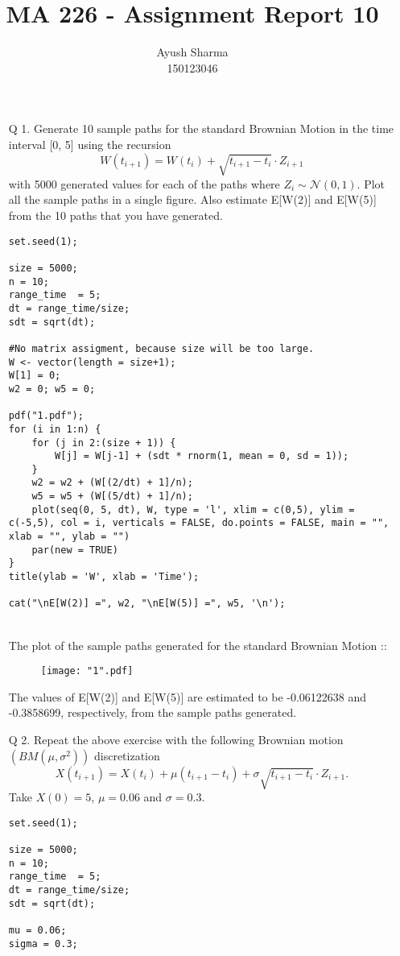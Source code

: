 \documentclass[11pt]{article}
\title{MA 226 - Assignment Report 10}
\author{Ayush Sharma\\150123046}
\begin{document}
\titlepage
\newpage
\begin{enumerate}
\item[Q 1.] Generate 10 sample paths for the standard Brownian Motion in the time interval [0, 5] using the recursion
$$W(t_{i+1}) = W(t_{i}) + \sqrt{t_{i+1} - t_{i}} \cdot Z_{i+1}$$
with 5000 generated values for each of the paths where $Z_{i} \sim \mathcal{N}(0,1)$. Plot all the sample paths in a single figure. Also estimate E[W(2)] and E[W(5)] from the 10 paths that you have generated.

\begin{lstlisting}
set.seed(1);

size = 5000;
n = 10;
range_time  = 5;
dt = range_time/size;
sdt = sqrt(dt);

#No matrix assigment, because size will be too large.
W <- vector(length = size+1);
W[1] = 0;
w2 = 0; w5 = 0;

pdf("1.pdf");
for (i in 1:n) {
	for (j in 2:(size + 1)) {
		W[j] = W[j-1] + (sdt * rnorm(1, mean = 0, sd = 1));
	}
	w2 = w2 + (W[(2/dt) + 1]/n);
	w5 = w5 + (W[(5/dt) + 1]/n);
	plot(seq(0, 5, dt), W, type = 'l', xlim = c(0,5), ylim = c(-5,5), col = i, verticals = FALSE, do.points = FALSE, main = "", xlab = "", ylab = "")
	par(new = TRUE)
}
title(ylab = 'W', xlab = 'Time');

cat("\nE[W(2)] =", w2, "\nE[W(5)] =", w5, '\n');
\end{lstlisting}
\newpage
{}\\
The plot of the sample paths generated for the standard Brownian Motion ::
\begin{figure}[H]
	\centering
	\texttt{[image: "1".pdf]}
\end{figure}

The values of E[W(2)] and E[W(5)] are estimated to be -0.06122638 and -0.3858699, respectively, from the sample paths generated.
\newpage
\item[Q 2.] Repeat the above exercise with the following Brownian motion $(BM(\mu,\sigma^{2}))$ discretization
$$X(t_{i+1}) = X(t_{i}) + \mu(t_{i+1} - t_{i}) + \sigma \sqrt{t_{i+1} - t_{i}} \cdot Z_{i+1}.$$
Take $X(0) = 5$, $\mu = 0.06$ and $\sigma = 0.3$.

\begin{lstlisting}
set.seed(1);

size = 5000;
n = 10;
range_time  = 5;
dt = range_time/size;
sdt = sqrt(dt);

mu = 0.06;
sigma = 0.3;


\end{lstlisting}
\end{enumerate}
\end{document}
